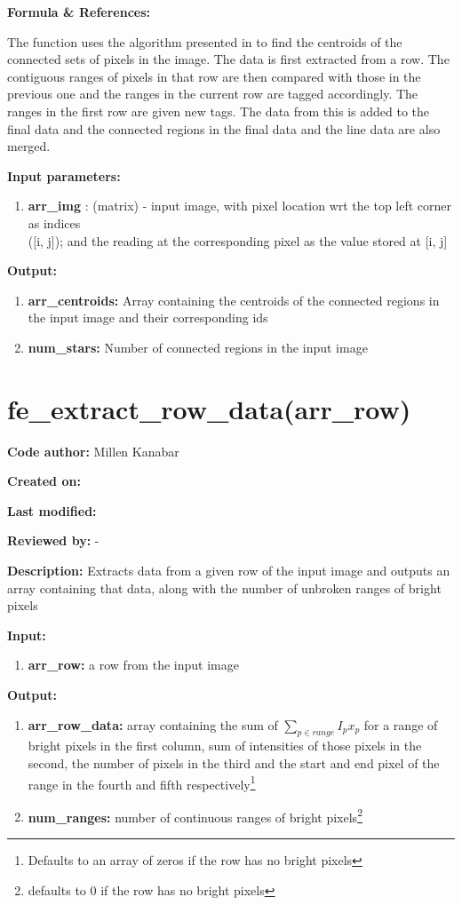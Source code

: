 \documentclass[a4paper, oneside,11pt]{article}
\begin{document}
    
    \textbf{Formula \& References:}
    
    The function uses the algorithm presented in \cite{5558171} to find the centroids of the connected sets of pixels in the image. The data is first extracted from a row. The contiguous ranges of pixels in that row are then compared with those in the previous one and the ranges in the current row are tagged accordingly. The ranges in the first row are given new tags. The data from this is added to the final data and the connected regions in the final data and the line data are also merged.

    
    \textbf{Input parameters:}
    \begin{enumerate}
        \item \textbf{arr\_img} : (matrix) - input image, with pixel location wrt the top left corner as indices\\([i, j]); and the reading at the corresponding pixel as the value stored at [i, j]
    \end{enumerate} 
    
    
    \textbf{Output:}
    \begin{enumerate}
        \item \textbf{arr\_centroids:} Array containing the centroids of the connected regions in the input image and their corresponding ids
        \item \textbf{num\_stars:} Number of connected regions in the input image
    \end{enumerate}
    
    
\section*{fe\_extract\_row\_data(arr\_row)}
\textbf{Code author:} Millen Kanabar


\textbf{Created on:} 


\textbf{Last modified:} 


\textbf{Reviewed by:} -


\textbf{Description:}    
    Extracts data from a given row of the input image and outputs an array containing that data, along with the number of unbroken ranges of bright pixels
    
\textbf{Input:}
\begin{enumerate}
    \item \textbf{arr\_row:} a row from the input image
\end{enumerate}

\textbf{Output:}
\begin{enumerate}
    \item \textbf{arr\_row\_data:} array containing the sum of $ \sum_{p\in range} I_p x_p $ for a range of bright pixels in the first column, sum of intensities of those pixels in the second, the number of pixels in the third and the start and end pixel of the range in the fourth and fifth respectively\footnote{Defaults to an array of zeros if the row has no bright pixels}
    \item \textbf{num\_ranges:} number of continuous ranges of bright pixels\footnote{defaults to 0  if the row has no bright pixels}
\end{enumerate}
\end{document}
